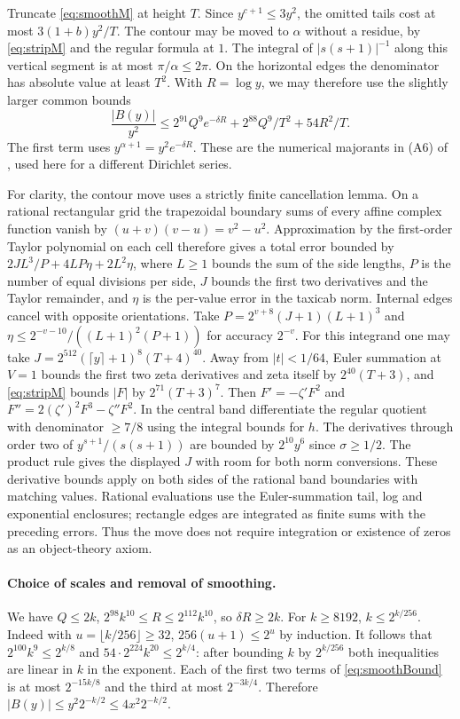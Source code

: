 Truncate \eqref{eq:smoothM} at height $T$. Since $y^{c+1}\le3y^2$,
the omitted tails cost at most $3(1+b)y^2/T$. The contour may be
moved to $\alpha$ without a residue, by \eqref{eq:stripM} and the
regular formula at $1$. The integral of $|s(s+1)|^{-1}$ along this
vertical segment is at most $\pi/\alpha\le2\pi$. On the horizontal
edges the denominator has absolute value at least $T^2$. With
$R=\log y$, we may therefore use the slightly larger common bounds
\begin{equation}\label{eq:smoothBound}
 \frac{|B(y)|}{y^2}
 \le 2^{91}Q^9e^{-\delta R}
       +2^{88}Q^9/T^2+54 R^2/T .
\end{equation}
The first term uses $y^{\alpha+1}=y^2e^{-\delta R}$.
These are the numerical majorants in (A6) of \cite{strip}, used here for
a different Dirichlet series.

For clarity, the contour move uses a strictly finite cancellation lemma.
On a rational rectangular grid the trapezoidal boundary sums of every
affine complex function vanish by $(u+v)(v-u)=v^2-u^2$. Approximation
by the first-order Taylor polynomial on each cell therefore gives a
total error bounded by $2JL^3/P+4LP\eta+2L^2\eta$, where $L\ge1$ bounds
the sum of the side lengths, $P$ is the number of equal divisions per
side, $J$ bounds the first two derivatives and the Taylor remainder,
and $\eta$ is the per-value error in the taxicab norm. Internal edges
cancel with opposite orientations. Take
$P=2^{v+8}(J+1)(L+1)^3$ and
$\eta\le 2^{-v-10}/((L+1)^2(P+1))$ for accuracy $2^{-v}$.
For this integrand one may take
$J=2^{512}(\lceil y\rceil+1)^8(T+4)^{40}$.
Away from $|t|<1/64$, Euler summation at $V=1$ bounds the first
two zeta derivatives and zeta itself by $2^{40}(T+3)$, and
\eqref{eq:stripM} bounds $|F|$ by $2^{71}(T+3)^7$.
Then $F'=-\zeta' F^2$ and
$F''=2(\zeta')^2F^3-\zeta''F^2$. In the central band differentiate
the regular quotient with denominator $\ge7/8$ using the integral bounds
for $h$. The derivatives through order two of $y^{s+1}/(s(s+1))$ are
bounded by $2^{10}y^6$ since $\sigma\ge1/2$.
The product rule gives the displayed $J$ with room for both norm
conversions. These derivative bounds apply on both sides of the rational
band boundaries with matching values. Rational evaluations use the
Euler-summation tail, log and exponential enclosures; rectangle edges
are integrated as finite sums with the preceding errors. Thus the move
does not require integration or existence of zeros as an object-theory axiom.

\paragraph{Choice of scales and removal of smoothing.}
We have $Q\le2k$, $2^{98}k^{10}\le R\le2^{112}k^{10}$,
so $\delta R\ge2k$. For $k\ge8192$, $k\le 2^{k/256}$.
Indeed with $u=\lfloor k/256\rfloor\ge32$, $256(u+1)\le2^u$ by
induction. It follows that
$2^{100}k^9\le2^{k/8}$ and $54\cdot2^{224}k^{20}\le2^{k/4}$:
after bounding $k$ by $2^{k/256}$ both inequalities are linear in $k$
in the exponent. Each of the first two terms of \eqref{eq:smoothBound}
is at most $2^{-15k/8}$ and the third at most $2^{-3k/4}$. Therefore
$|B(y)|\le y^2 2^{-k/2}\le4x^2 2^{-k/2}$.

